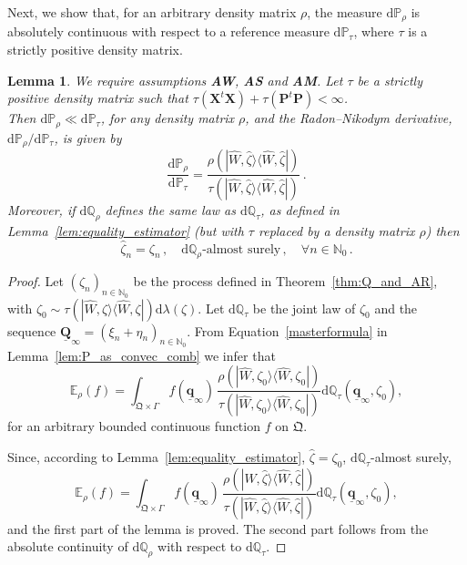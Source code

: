 \documentclass[12pt]{article}
\newtheorem{lemma}[theorem]{Lemma}
\newcommand{\ket}[1]{|{#1}\rangle}
\newcommand{\bra}[1]{\langle{#1}|}
\renewcommand{\d}{{\mathrm d}}
\begin{document}
Next, we show that, for an arbitrary density matrix $\rho$, the measure $\d\mathbb P_\rho$ is absolutely continuous with respect to a reference measure 
$\d\mathbb P_\tau$, where $\tau$ is a strictly positive density matrix.
\begin{lemma}\label{lem:AC}
	We require assumptions {\bf{AW}}, {\bf{AS}} and {\bf{AM}}. Let $\tau$ be a strictly positive density matrix such that $\tau(\mathbf X^t\mathbf X)+\tau(\mathbf P^t\mathbf P)<\infty$.\\
	Then $\d\mathbb P_\rho\ll \d\mathbb P_\tau$, for any density matrix $\rho$, and the Radon--Nikodym derivative, 
	$\d\mathbb P_\rho/\d\mathbb P_\tau$, is given by
	$$\frac{\d\mathbb P_\rho}{\d\mathbb P_\tau}=\frac{\rho(\ket{\widehat W,\widehat \zeta}\bra{\widehat W,\widehat \zeta})}{\tau(\ket{\widehat W,\widehat \zeta}\bra{\widehat W,\widehat \zeta})}\,.$$
	Moreover, if $\d\mathbb Q_\rho$ defines the same law as $\d\mathbb Q_\tau$, as defined in Lemma~\ref{lem:equality_estimator} (but with $\tau$ replaced by a density matrix $\rho$) then
		$$\widehat \zeta_n=\zeta_n\,, \quad \d\mathbb Q_\rho\mbox{-almost surely}\,, \quad \forall n\in \mathbb N_0\,.$$
\end{lemma}

\begin{proof}
	Let $(\zeta_n)_{n\in\mathbb N_0}$ be the process defined in Theorem~\ref{thm:Q_and_AR}, with 
	$\zeta_0\sim \tau(\ket{\widehat W,\zeta}\bra{\widehat W,\zeta})\d\lambda(\zeta)$. Let $\d \mathbb Q_\tau$ be the joint law of $\zeta_0$ and the sequence $\underline{\mathbf Q}_\infty=(\xi_n+ \eta_n)_{n\in\mathbb N_0}$.
	From Equation~\eqref{masterformula} in Lemma~\ref{lem:P_as_convec_comb} we infer that 
$$\mathbb E_{\rho}(f)=\int_{\mathfrak Q \times \Gamma} f(\underline{\mathbf q}_{\infty})\, \frac{\rho(\ket{\widehat W,\zeta_0}\bra{\widehat W,\zeta_0})}{\tau(\ket{\widehat W,\zeta_0}\bra{\widehat W,\zeta_0})}\d\mathbb Q_{\tau}(\underline{\mathbf q}_{\infty}, \zeta_0),$$
for an arbitrary bounded continuous function $f$ on $\mathfrak Q$.

	Since, according to Lemma~\ref{lem:equality_estimator}, $\widehat \zeta=\zeta_0$, $\d\mathbb Q_\tau$-almost surely, 
	$$\mathbb E_{\rho}(f)=\int_{\mathfrak Q \times \Gamma} f(\underline{\mathbf q}_{\infty})\, \frac{\rho(\ket{\widehat W,\widehat{\zeta}}\bra{\widehat W,\widehat{\zeta}})}{\tau(\ket{\widehat W,\widehat{\zeta}}\bra{\widehat W,\widehat{\zeta}})}\d\mathbb Q_{\tau}(\underline{\mathbf q}_{\infty}, \zeta_0),$$
and the first part of the lemma is proved. The second part follows from the absolute continuity of $\d\mathbb Q_\rho$ with respect to $\d\mathbb Q_\tau$.
\end{proof}
\end{document}
